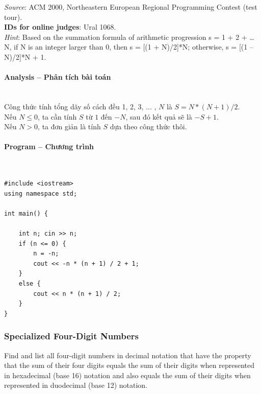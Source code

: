 \documentclass{article}
\begin{document}
\textit{Source}: ACM 2000, Northeastern European Regional Programming Contest (test tour). \\

\textbf{IDs for online judges}: Ural 1068. \\

\textit{Hint}: Based on the summation formula of arithmetic progression s = 1 + 2 + … N, if N is an integer larger than 0, then s = [(1 + N)/2]*N; otherwise, s = [(1 – N)/2]*N + 1.


\paragraph{Analysis -- Phân tích bài toán} \mbox{} \\

Công thức tính tổng dãy số cách đều {1, 2, 3, ... , $N$} là $S = N * ( N + 1) / 2$.\\

Nếu $N \leq 0$, ta cần tính $S$ từ $1$ đến $-N$, sau đó kết quả sẽ là $-S+1$. \\

Nếu $N > 0$, ta đơn giản là tính $S$ dựa theo công thức thôi. \\

\paragraph{Program -- Chương trình} \mbox{} \\


\begin{lstlisting}
#include <iostream>
using namespace std;

int main() {

	int n; cin >> n;
	if (n <= 0) {
		n = -n;
		cout << -n * (n + 1) / 2 + 1;
	}
	else {
		cout << n * (n + 1) / 2;
	}
}

\end{lstlisting}



\subsubsection{Specialized Four-Digit Numbers}

Find and list all four-digit numbers in decimal notation that have the property that the sum of their four digits equals the sum of their digits when represented in hexadecimal (base 16) notation and also equals the sum of their digits when represented in duodecimal (base 12) notation. \\
\end{document}
